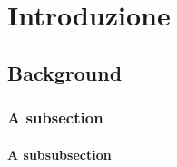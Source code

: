 \chapter{Introduzione}

\lipsum[1]

\section{Background}

\lipsum[2]

\subsection{A subsection}

\lipsum[3]

\subsubsection{A subsubsection}

\lipsum[4]